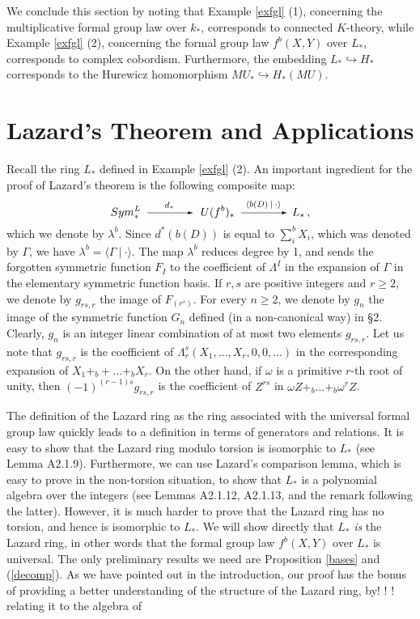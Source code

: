 \documentclass[a4paper,12pt]{amsart}
\theoremstyle{definition}
\numberwithin{equation}{section}
\newcommand{\arr}{\begin{picture}(45,5) \put(3,2.5){\vector(1,0){40}} \end{picture}}
\newcommand{\arrl}[1]{\stackrel{#1}{\arr}}
\newcommand{\br}[1]{\langle#1\rangle}
\newcommand{\dual}[2]{\br{#1 \:|\: #2}}
\begin{document}
We conclude this section by noting that Example \ref{exfgl} (1), concerning the multiplicative formal group law over $k_*$, corresponds to connected $K$-theory, while Example \ref{exfgl} (2), concerning the formal group law $f^b(X,Y)$ over $L_*$, corresponds to complex cobordism. Furthermore, the embedding $L_*\hookrightarrow H_*$ corresponds to the Hurewicz homomorphism $MU_*\hookrightarrow H_*(MU)$. 

\section{Lazard's Theorem and Applications}

Recall the ring $L_*$ defined in Example \ref{exfgl} (2). An important ingredient for the proof of Lazard's theorem is the following composite map:
\[
Sym_*^L\arrl{d_*}\:U(f^b)_*\arrl{\dual{b(D)}{\cdot}}L_*\,,
\]
which we denote by $\lambda^b$. Since $d^*(b(D))$ is equal to $\sum_i^b X_i$, which was denoted by $\varGamma$, we have $\lambda^b=\dual{\varGamma}{\cdot}$. The map $\lambda^b$ reduces degree by 1, and sends the forgotten symmetric function $F_I$ to the coefficient of $\varLambda^I$ in the expansion of $\varGamma$ in the elementary symmetric function basis. If $r,s$ are positive integers and $r\ge 2$, we denote by $g_{rs,r}$ the image of $F_{(r^s)}$. For every $n\ge 2$, we denote by $g_n$ the image of the symmetric function $G_n$ defined (in a non-canonical way) in \S2. Clearly, $g_n$ is an integer linear combination of at most two elements $g_{rs,r}$. Let us note that $g_{rs,r}$ is the coefficient of $\varLambda_r^s(X_1,\ldots,X_r,0,0,\ldots)$ in the corresponding expansion of $X_1+_b+\ldots+_b X_r$. On the other hand, if $\omega$ is a primitive $r$-th root of unity, then $(-1)^{(r-1)s}g_{rs,r}$ is the coefficient of $Z^{rs}$ in $\omega Z+_b\ldots+_b\omega^r Z$. 

The definition of the Lazard ring as the ring associated with the universal formal group law quickly leads to a definition in terms of generators and relations. It is easy to show that the Lazard ring modulo torsion is isomorphic to $L_*$ (see \cite{ravccs} Lemma A2.1.9). Furthermore, we can use Lazard's comparison lemma, which is easy to prove in the non-torsion situation, to show that $L_*$ is a polynomial algebra over the integers (see \cite{ravccs} Lemmas A2.1.12, A2.1.13, and the remark following the latter). However, it is much harder to prove that the Lazard ring has no torsion, and hence is isomorphic to $L_*$. We will show directly that $L_*$ {\em is} the Lazard ring, in other words that the formal group law $f^b(X,Y)$ over $L_*$ is universal. The only preliminary results we need are Proposition \ref{bases} and (\ref{decomp}). As we have pointed out in the introduction, our proof has the bonus of providing a better understanding of the structure of the Lazard ring, by!
!
!
 relating it to the algebra of 
\end{document}
